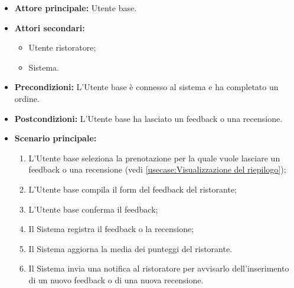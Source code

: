 \label{usecase:Inserimento di feedback e recensioni}
\begin{itemize}
	\item \textbf{Attore principale:} Utente base.

	\item \textbf{Attori secondari:}
	      \begin{itemize}
		      \item Utente ristoratore;
		      \item Sistema.
	      \end{itemize}

	\item \textbf{Precondizioni:}
	      L'Utente base è connesso al sistema e ha completato un ordine.

	\item \textbf{Postcondizioni:}
	      L'Utente base ha lasciato un feedback o una recensione.

	\item \textbf{Scenario principale:}
	      \begin{enumerate}
		      \item L'Utente base seleziona la prenotazione per la quale vuole
		            lasciare un feedback o una recensione (vedi
		            \autoref{usecase:Visualizzazione del riepilogo});

		      \item L'Utente base compila il form del feedback del ristorante;

		      \item L'Utente base conferma il feedback;

		      \item Il Sistema registra il feedback o la recensione;

		      \item Il Sistema aggiorna la media dei punteggi del ristorante.

		      \item Il Sistema invia una notifica al ristoratore per avvisarlo
		            dell'inserimento di un nuovo feedback o di una nuova
		            recensione.
	      \end{enumerate}
\end{itemize}
